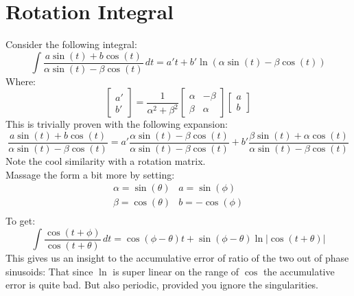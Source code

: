 
\section{Rotation Integral}
Consider the following integral:
\[\int\frac{a\sin(t)+b\cos(t)}{\alpha\sin(t)-\beta\cos(t)}\,dt = a't+b'\ln(\alpha\sin(t)-\beta\cos(t))\]
Where:
\[\begin{bmatrix}a'\\b'\end{bmatrix} = \frac{1}{\alpha^2+\beta^2}\begin{bmatrix} \alpha & -\beta\\\beta &\alpha\end{bmatrix}\begin{bmatrix}a\\b\end{bmatrix}\]
This is trivially proven with the following expansion: 
\[\frac{a\sin(t)+b\cos(t)}{\alpha\sin(t)-\beta\cos(t)} = a'\frac{\alpha\sin(t)-\beta\cos(t)}{\alpha\sin(t)-\beta\cos(t)} +b'\frac{\beta\sin(t)+\alpha\cos(t)}{\alpha\sin(t)-\beta\cos(t)}\] 
Note the cool similarity with a rotation matrix.
\\

Massage the form a bit more by setting:
\[\begin{matrix}
	\alpha = \sin(\theta) & a = \sin(\phi)\\
	\beta = \cos(\theta) & b = -\cos(\phi)\\
\end{matrix}\]
To get:
\[\int\frac{\cos(t+\phi)}{\cos(t+\theta)}\,dt=\cos(\phi-\theta)t+\sin(\phi-\theta)\ln|\cos(t+\theta)|\]
This gives us an insight to the accumulative error of ratio of the two out of phase sinusoids:
That since $\ln$ is super linear on the range of $\cos$ the accumulative error is quite bad.
But also periodic,
provided you ignore the singularities.
